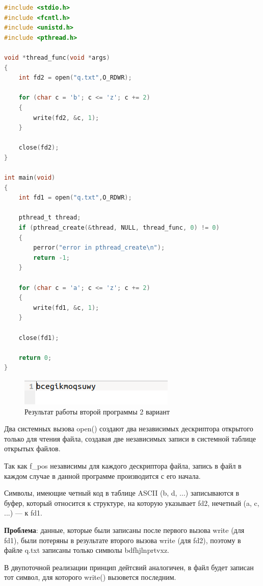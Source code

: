 \documentclass[12pt]{report}
\begin{document}
\begin{lstlisting}[language=c, label=p2thread, caption=Вторая программа (с потоками) 2 вариант]
#include <stdio.h>
#include <fcntl.h>
#include <unistd.h>
#include <pthread.h>

void *thread_func(void *args)
{
  	int fd2 = open("q.txt",O_RDWR);

    for (char c = 'b'; c <= 'z'; c += 2)
    {
        write(fd2, &c, 1);
    }
    
    close(fd2);
}

int main(void)
{
 	int fd1 = open("q.txt",O_RDWR);
    
    pthread_t thread;
    if (pthread_create(&thread, NULL, thread_func, 0) != 0)
	{
		perror("error in pthread_create\n");
		return -1;
	}

    for (char c = 'a'; c <= 'z'; c += 2)
    {
        write(fd1, &c, 1);
    }

    close(fd1);

    return 0;
}

\end{lstlisting}

\begin{figure}[H]
	\centering
	\includegraphics[scale=1]{22lout.png}
	\caption{Результат работы второй программы 2 вариант}
	\label{fig:prog_022_thread}
\end{figure}

\clearpage

Два системных вызова open() создают два независимых дескриптора открытого только для чтения файла, создавая две независимых записи в системной таблице открытых файлов.

Так как f\_pos независимы для каждого дескриптора файла, запись в файл в каждом случае  в данной программе производится с его начала.

Символы, имеющие четный код в таблице ASCII  (b, d, ...) записываются в буфер, который относится к структуре, на которую указывает fd2, нечетный (a, c, ...) --- к fd1. 

\textbf{Проблема}: данные, которые были записаны после первого вызова write (для fd1), были потеряны в результате второго вызова write (для fd2), поэтому в файле q.txt записаны только символы bdfhjlnprtvxz.

В двупоточной реализации принцип дейтсвий аналогичен, в файл будет записан тот символ, для которого write() вызовется последним.
\end{document}
